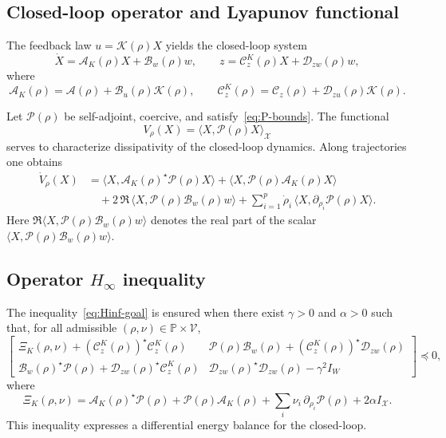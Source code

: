 \documentclass[AMA,Times2COL]{WileyNJDv5}
\newcommand{\preceqop}{\mathrel{\preccurlyeq}}
\begin{document}
\subsection{Closed-loop operator and Lyapunov functional}

The feedback law $u=\mathcal{K}(\rho)X$ yields the closed-loop system
\[
\dot X = \mathcal{A}_K(\rho)X + \mathcal{B}_w(\rho)w,
\qquad
z = \mathcal{C}_z^K(\rho)X + \mathcal{D}_{zw}(\rho)w,
\]
where
\[
\mathcal{A}_K(\rho)=\mathcal{A}(\rho)+\mathcal{B}_u(\rho)\mathcal{K}(\rho),
\qquad
\mathcal{C}_z^K(\rho)=\mathcal{C}_z(\rho)+\mathcal{D}_{zu}(\rho)\mathcal{K}(\rho).
\]

Let $\mathcal{P}(\rho)$ be self-adjoint, coercive, and satisfy~\eqref{eq:P-bounds}.
The functional
\[
V_\rho(X)=\langle X,\mathcal{P}(\rho)X\rangle_{\mathscr{X}}
\]
serves to characterize dissipativity of the closed-loop dynamics.
Along trajectories one obtains
\begin{align}\label{eq:Hinf-derivative}
\dot V_\rho(X)
&=
\langle X,\mathcal{A}_K(\rho)^{\star}\mathcal{P}(\rho)X\rangle
+
\langle X,\mathcal{P}(\rho)\mathcal{A}_K(\rho)X\rangle \nonumber\\
&\quad
+2\,\Re\,\langle X,\mathcal{P}(\rho)\mathcal{B}_w(\rho)w\rangle
+
\sum_{i=1}^p \dot\rho_i\,
\langle X,\partial_{\rho_i}\mathcal{P}(\rho)X\rangle .
\end{align}
Here $\Re\langle X,\mathcal{P}(\rho)\mathcal{B}_w(\rho)w\rangle$ denotes the real part of the scalar  $\langle X,\mathcal{P}(\rho)\mathcal{B}_w(\rho)w\rangle$.

\subsection{Operator \texorpdfstring{$H_\infty$}{H-infinity} inequality}

The inequality~\eqref{eq:Hinf-goal} is ensured when there exist $\gamma>0$ and $\alpha>0$ such that, for all admissible $(\rho,\nu)\in\mathbb{P}\times\mathcal{V}$,
\begin{equation}\label{eq:ODLMI-Hinf}
\begin{bmatrix}
\Xi_K(\rho,\nu)+(\mathcal{C}_z^K(\rho))^{\star}\mathcal{C}_z^K(\rho)
&
\mathcal{P}(\rho)\mathcal{B}_w(\rho)+(\mathcal{C}_z^K(\rho))^{\star}\mathcal{D}_{zw}(\rho)
\\[0.3em]
\mathcal{B}_w(\rho)^{\star}\mathcal{P}(\rho)+\mathcal{D}_{zw}(\rho)^{\star}\mathcal{C}_z^K(\rho)
&
\mathcal{D}_{zw}(\rho)^{\star}\mathcal{D}_{zw}(\rho)-\gamma^{2}I_W
\end{bmatrix}
\preceqop 0,
\end{equation}
where
\[
\Xi_K(\rho,\nu)
=
\mathcal{A}_K(\rho)^{\star}\mathcal{P}(\rho)
+
\mathcal{P}(\rho)\mathcal{A}_K(\rho)
+
\sum_i \nu_i\,\partial_{\rho_i}\mathcal{P}(\rho)
+
2\alpha I_{\mathscr X}.
\]
This inequality expresses a differential energy balance for the closed-loop.
\end{document}
